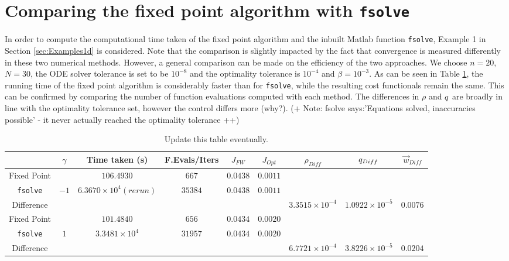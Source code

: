 \section{Comparing the fixed point algorithm with \texttt{fsolve}}
\label{app:fsolveComparison}

In order to compute the computational time taken of the fixed point algorithm and the inbuilt Matlab function \texttt{fsolve}, Example 1 in Section \ref{sec:Examples1d} is considered. Note that the comparison is slightly impacted by the fact that convergence is measured differently in these two numerical methods. However, a general comparison can be made on the efficiency of the two approaches.
We choose $n=20$, $N=30$, the ODE solver tolerance is set to be $10^{-8}$ and the optimality tolerance is $10^{-4}$ and $\beta = 10^{-3}$. 
As can be seen in Table \ref{TabApp3}, the running time of the fixed point algorithm is considerably faster than for \texttt{fsolve}, while the resulting cost functionals remain the same. This can be confirmed by comparing the number of function evaluations computed with each method. The differences in $\rho$ and $q$ are broadly in line with the optimality tolerance set, however the control differs more (why?). (+ Note: fsolve says:'Equations solved, inaccuracies possible' - it never actually reached the optimality tolerance ++)
\begin{table}[h]
	\begin{tabular}{ ||c|| c | c | c | c |c | c | c | c ||}
		\hline
	        & $\gamma$ & Time taken (s) & F.Evals/Iters & $J_{FW}$ & $J_{Opt}$ & $\rho_{Diff}$ & $q_{Diff}$ & $\vec{w}_{Diff}$\\
		\hline
		Fixed Point & & $106.4930$ & $667$ & $0.0438$ & $0.0011$ & & & \\
		\texttt{fsolve} & $-1$ & $6.3670 \times 10^4 (rerun)$ & $35384$ & $0.0438$ & $0.0011$ & & & \\
		Difference &  &  &  &  &  & $3.3515 \times 10^{-4}$ & $1.0922\times 10^{-5}$ & $0.0076$\\
		\hline
		Fixed Point & & $101.4840$ & $656$ & $0.0434$ & $0.0020$ & & & \\
		\texttt{fsolve} & $1$ & $3.3481 \times 10^4 $ & $31957$ & $0.0434$ & $0.0020$ & & & \\
		Difference &  &  &  &  &  & $6.7721 \times 10^{-4}$ & $3.8226 \times 10^{-5}$ & $0.0204$\\
		\hline        
	\end{tabular}
	\caption{Update this table eventually.}
\label{TabApp3}
\end{table}
